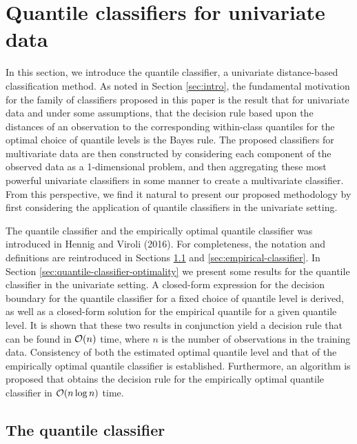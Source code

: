 
\section{Quantile classifiers for univariate data}
\label{sec:univariate-classifier}

In this section, we introduce the quantile classifier, a univariate
distance-based classification method.  As noted in Section \ref{sec:intro}, the
fundamental motivation for the family of classifiers proposed in this paper is
the result that for univariate data and under some assumptions, that the
decision rule based upon the distances of an observation to the corresponding
within-class quantiles for the optimal choice of quantile levels is the Bayes
rule.  The proposed classifiers for multivariate data are then constructed by
considering each component of the observed data as a 1-dimensional problem, and
then aggregating these most powerful univariate classifiers in some manner to
create a multivariate classifier.  From this perspective, we find it natural to
present our proposed methodology by first considering the application of
quantile classifiers in the univariate setting.

The quantile classifier and the empirically optimal quantile classifier was
introduced in Hennig and Viroli (2016).  For completeness, the notation and
definitions are reintroduced in Sections \ref{sec:quantile-classifier} and
\ref{sec:empirical-classifier}.  In Section
\ref{sec:quantile-classifier-optimality} we present some results for the
quantile classifier in the univariate setting.  A closed-form expression for the
decision boundary for the quantile classifier for a fixed choice of quantile
level is derived, as well as a closed-form solution for the empirical quantile
for a given quantile level.  It is shown that these two results in conjunction
yield a decision rule that can be found in $\mathcal{O}(n)$ time, where $n$ is the
number of observations in the training data.  Consistency of both the estimated
optimal quantile level and that of the empirically optimal quantile classifier
is established.  Furthermore, an algorithm is proposed that obtains the decision
rule for the empirically optimal quantile classifier in $\mathcal{O}(n \log n)$ time.




\subsection{The quantile classifier}
\label{sec:quantile-classifier}

